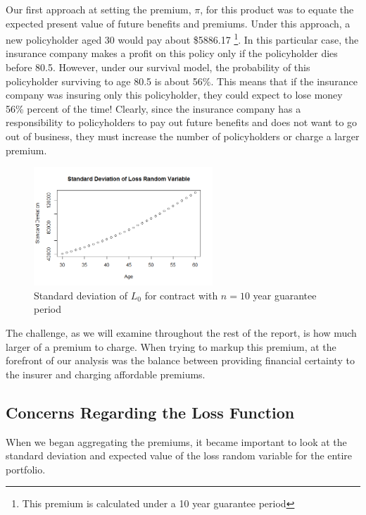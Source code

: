 \documentclass[12pt]{article}
\begin{document}
Our first approach at setting the premium, $\pi$, for this product was to equate the expected present value of future benefits and premiums. Under this approach, a new policyholder aged 30 would pay about \$5886.17 \footnote{This premium is calculated under a 10 year guarantee period}. In this particular case, the insurance company makes a profit on this policy only if the policyholder dies before 80.5. However, under our survival model, the probability of this policyholder surviving to age 80.5 is about 56\%. This means that if the insurance company was insuring only this policyholder, they could expect to lose money 56\% percent of the time! Clearly, since the insurance company has a responsibility to policyholders to pay out future benefits and does not want to go out of business, they must increase the number of policyholders or charge a larger premium.

\begin{figure}[!ht]
\begin{center}
\includegraphics[width=0.6\textwidth]{images/stdevValues}
\end{center}
\vspace{-5mm}
\caption{Standard deviation of $L_{0}$ for contract with $n=10$ year guarantee period}
\label{figure:lossFunctionEPV}
\end{figure}

The challenge, as we will examine throughout the rest of the report, is how much larger of a premium to charge. When trying to markup this premium, at the forefront of our analysis was the balance between providing financial certainty to the insurer and charging affordable premiums.

\subsection{Concerns Regarding the Loss Function}

When we began aggregating the premiums, it became important to look at the standard deviation and expected value of the loss random variable for the entire portfolio. 
\end{document}
